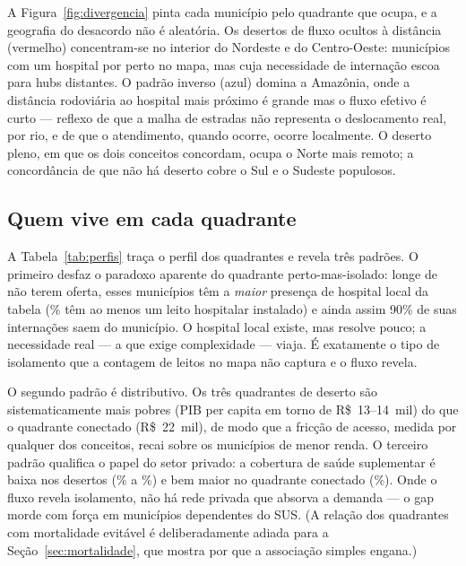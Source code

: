 A Figura~\ref{fig:divergencia} pinta cada município pelo quadrante que ocupa, e
a geografia do desacordo não é aleatória. Os desertos de fluxo ocultos à
distância (vermelho) concentram-se no interior do Nordeste e do Centro-Oeste:
municípios com um hospital por perto no mapa, mas cuja necessidade de internação
escoa para hubs distantes. O padrão inverso (azul) domina a Amazônia, onde a
distância rodoviária ao hospital mais próximo é grande mas o fluxo efetivo é
curto --- reflexo de que a malha de estradas não representa o deslocamento real,
por rio, e de que o atendimento, quando ocorre, ocorre localmente. O deserto
pleno, em que os dois conceitos concordam, ocupa o Norte mais remoto; a
concordância de que não há deserto cobre o Sul e o Sudeste populosos.

\subsection{Quem vive em cada quadrante}

A Tabela~\ref{tab:perfis} traça o perfil dos quadrantes e revela três padrões.
O primeiro desfaz o paradoxo aparente do quadrante perto-mas-isolado: longe de
não terem oferta, esses municípios têm a \emph{maior} presença de hospital local
da tabela (\valFOhosp\% têm ao menos um leito hospitalar instalado) e ainda assim
90\% de suas internações saem do município.%
O hospital local existe, mas resolve pouco; a necessidade real --- a que exige
complexidade --- viaja. É exatamente o tipo de isolamento que a contagem de
leitos no mapa não captura e o fluxo revela.

O segundo padrão é distributivo. Os três quadrantes de deserto são
sistematicamente mais pobres (PIB per capita em torno de R\$~13--14~mil) do que o
quadrante conectado (R\$~22~mil), de modo que a fricção de acesso, medida por
qualquer dos conceitos, recai sobre os municípios de menor renda. O terceiro
padrão qualifica o papel do setor privado: a cobertura de saúde suplementar é
baixa nos desertos (\valBOans\% a \valDOans\%) e bem maior no quadrante conectado
(\valNEans\%). Onde o fluxo revela isolamento, não há rede privada que absorva a
demanda --- o gap morde com força em municípios dependentes do SUS. (A relação
dos quadrantes com mortalidade evitável é deliberadamente adiada para a
Seção~\ref{sec:mortalidade}, que mostra por que a associação simples engana.)

